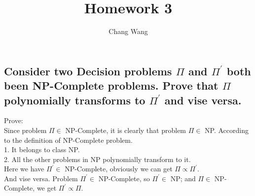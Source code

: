 \documentclass[12pt,a4paper]{report}
\title{Homework 3}
\author{Chang Wang}
\begin{document}
\maketitle

\section{}
\subsection{Consider two Decision problems $\Pi$ and $\Pi^{'}$ both been NP-Complete problems. Prove that $\Pi$ polynomially transforms to $\Pi^{'}$ and vise versa. }

Prove: \\[0.4cm]
Since problem $\Pi \in$ NP-Complete, it is clearly that problem $\Pi \in$ NP. According to the definition of NP-Complete problem. \\[0.3cm]
1. It belongs to class NP. \\[0.3cm]
2. All the other problems in NP polynomially transform to it. \\[0.3cm]
Here we have $\Pi^{'} \in$ NP-Complete, obviously we can get $\Pi \propto \Pi^{'}$. \\[0.3cm]
And vise versa.
Problem $\Pi^{'} \in$ NP-Complete, so $\Pi^{'} \in$ NP; and $\Pi \in$ NP-Complete, we get $\Pi^{'} \propto \Pi$. 
\end{document}
